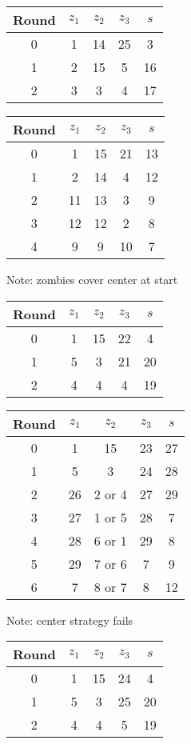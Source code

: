 \begin{table}
\begin{tabular}{c | c | c | c | c }
Round & $z_1$ & $z_2$ & $z_3$ & $s$ \\
\hline
0 & 1 & 14 & 25 & 3 \\
1 & 2 & 15 & 5 & 16 \\
2 & 3 & 3 & 4 & 17
\end{tabular}
\end{table}

\begin{table}
\begin{tabular}{c | c | c | c | c }
Round & $z_1$ & $z_2$ & $z_3$ & $s$ \\
\hline
0 & 1 & 15 & 21 & 13 \\
1 & 2 & 14 & 4 & 12 \\
2 & 11 & 13 & 3 & 9 \\
3 & 12 & 12 & 2 & 8 \\
4 & 9 & 9 & 10 & 7
\end{tabular}
\end{table}
Note: zombies cover center at start

\begin{table}
\begin{tabular}{c | c | c | c | c }
Round & $z_1$ & $z_2$ & $z_3$ & $s$ \\
\hline
0 & 1 & 15 & 22 & 4 \\
1 & 5 & 3 & 21 & 20 \\
2 & 4 & 4 & 4 & 19
\end{tabular}
\end{table}

\begin{table}
\begin{tabular}{c | c | c | c | c }
Round & $z_1$ & $z_2$ & $z_3$ & $s$ \\
\hline
0 & 1 & 15 & 23 & 27 \\
1 & 5 & 3 & 24 & 28 \\
2 & 26 & 2 or 4 & 27 & 29 \\
3 & 27 & 1 or 5 & 28 & 7 \\
4 & 28 & 6 or 1 & 29 & 8 \\
5 & 29 & 7 or 6 & 7 & 9 \\
6 & 7 & 8 or 7 & 8 & 12
\end{tabular}
\end{table}
Note: center strategy fails


\begin{table}
\begin{tabular}{c | c | c | c | c }
Round & $z_1$ & $z_2$ & $z_3$ & $s$ \\
\hline
0 & 1 & 15 & 24 & 4 \\
1 & 5 & 3 & 25 & 20 \\
2 & 4 & 4 & 5 & 19
\end{tabular}
\end{table}

